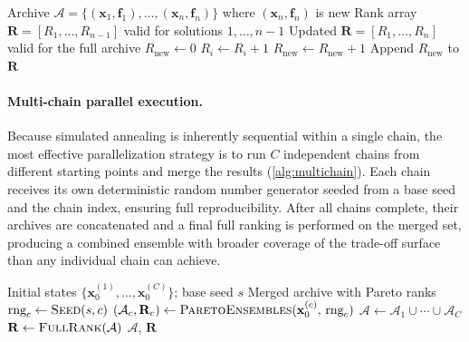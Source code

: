 \documentclass[preprint,review,12pt]{elsarticle}
\begin{document}
\begin{algorithm}[H]
\caption{\textsc{RankInsert}$(\mathcal{A}, \mathbf{R})$: Incremental rank update after appending one solution}\label{alg:rankinsert}
\begin{algorithmic}[1]
\Require Archive $\mathcal{A} = \{(\mathbf{x}_1, \mathbf{f}_1), \ldots, (\mathbf{x}_n, \mathbf{f}_n)\}$ where $(\mathbf{x}_n, \mathbf{f}_n)$ is new
\Require Rank array $\mathbf{R} = [R_1, \ldots, R_{n-1}]$ valid for solutions $1, \ldots, n{-}1$
\Ensure Updated $\mathbf{R} = [R_1, \ldots, R_n]$ valid for the full archive
\State $R_{\text{new}} \gets 0$
    \State $R_i \gets R_i + 1$
  \EndIf
    \State $R_{\text{new}} \gets R_{\text{new}} + 1$
  \EndIf
\EndFor
\State Append $R_{\text{new}}$ to $\mathbf{R}$
\end{algorithmic}
\end{algorithm}

\paragraph{Multi-chain parallel execution.}
Because simulated annealing is inherently sequential within a single chain, the most effective parallelization strategy is to run $C$ independent chains from different starting points and merge the results (\cref{alg:multichain}).
Each chain receives its own deterministic random number generator seeded from a base seed and the chain index, ensuring full reproducibility.
After all chains complete, their archives are concatenated and a final full ranking is performed on the merged set, producing a combined ensemble with broader coverage of the trade-off surface than any individual chain can achieve.

\begin{algorithm}[H]
\caption{\textsc{ParetoEnsemblesParallel}: Multi-chain parallel execution}\label{alg:multichain}
\begin{algorithmic}[1]
\Require Initial states $\{\mathbf{x}_0^{(1)}, \ldots, \mathbf{x}_0^{(C)}\}$; base seed $s$
\Ensure Merged archive with Pareto ranks
  \State $\text{rng}_c \gets \textsc{Seed}(s, c)$
  \State $(\mathcal{A}_c, \mathbf{R}_c) \gets \textsc{ParetoEnsembles}(\mathbf{x}_0^{(c)},\, \text{rng}_c)$
\EndFor
\State $\mathcal{A} \gets \mathcal{A}_1 \cup \cdots \cup \mathcal{A}_C$
\State $\mathbf{R} \gets \textsc{FullRank}(\mathcal{A})$
\State \Return $\mathcal{A},\, \mathbf{R}$
\end{algorithmic}
\end{algorithm}
\end{document}
